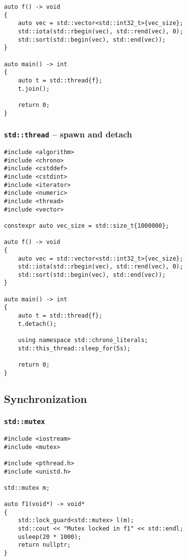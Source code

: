\begin{appendix}
\begin{lstlisting}
auto f() -> void
{
    auto vec = std::vector<std::int32_t>{vec_size};
    std::iota(std::rbegin(vec), std::rend(vec), 0);
    std::sort(std::begin(vec), std::end(vec));
}

auto main() -> int
{
    auto t = std::thread{f};
    t.join();
    
    return 0;
}
\end{lstlisting}

\subsubsection{\texttt{std::thread} -- spawn and detach}\label{app:conc_thread_detach}

\begin{lstlisting}
#include <algorithm>
#include <chrono>
#include <cstddef>
#include <cstdint>
#include <iterator>
#include <numeric>
#include <thread>
#include <vector>

constexpr auto vec_size = std::size_t{1000000};

auto f() -> void
{
    auto vec = std::vector<std::int32_t>{vec_size};
    std::iota(std::rbegin(vec), std::rend(vec), 0);
    std::sort(std::begin(vec), std::end(vec));
}

auto main() -> int
{
    auto t = std::thread{f};
    t.detach();
    
    using namespace std::chrono_literals;
    std::this_thread::sleep_for(5s);
    
    return 0;
}
\end{lstlisting}

\subsection{Synchronization}\label{app:scorep_sync}

\subsubsection{\texttt{std::mutex}}\label{app:scorep_sync_mutex}

\begin{lstlisting}
#include <iostream>
#include <mutex>

#include <pthread.h>
#include <unistd.h>

std::mutex m;

auto f1(void*) -> void*
{
    std::lock_guard<std::mutex> l(m);
    std::cout << "Mutex locked in f1" << std::endl;
    usleep(20 * 1000);
    return nullptr;
}


\end{lstlisting}
\end{appendix}
